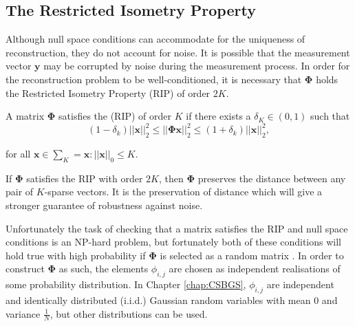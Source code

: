 \subsection{The Restricted Isometry Property}
\label{sec:restr-isom-prop}
Although null space conditions can accommodate for the uniqueness of reconstruction, they do not account for noise. It is possible that the measurement vector $\boldsymbol{y}$ may be corrupted by noise during the measurement process. In order for the reconstruction problem to be well-conditioned, it is necessary that ${\boldsymbol{\Phi}}$ holds the Restricted Isometry Property (RIP) \cite{Donoho2006} of order $2K$. 
\begin{mydef}
 A matrix $\boldsymbol{\Phi}$ satisfies the (RIP) of order $K$ if there exists a $\delta_K  \in (0,1)$ such that 
\begin{equation*}
  \label{eq:40}
  (1 - \delta_k)||\boldsymbol{x}||^2_2 \leq||\boldsymbol{\Phi} \boldsymbol{x}||^2_2 \leq (1 + \delta_k)||\boldsymbol{x}||^2_2,
\end{equation*}

for all $\boldsymbol{x} \in \sum_K = {\boldsymbol{x}:||\boldsymbol{x}||_0 \leq K} $. 
\end{mydef}

%

If $\boldsymbol{\Phi}$ satisfies the RIP with order $2K$, then $\boldsymbol{\Phi}$ preserves the distance between any pair of $K$-sparse vectors. It is the preservation of distance which will give a stronger guarantee of robustness against noise. 


Unfortunately the task of checking that a matrix satisfies the RIP and null space conditions is an NP-hard problem, but fortunately both of these conditions will hold true with high probability if $\boldsymbol{\Phi}$ is selected as a random matrix \citep{Baraniuk2007}. In order to construct $\boldsymbol{\Phi}$ as such, the elements  $\phi_{i,j}$  are chosen as independent realisations of some probability distribution. In Chapter \ref{chap:CSBGS}, $\phi_{i,j}$ are independent and identically distributed (i.i.d.) Gaussian random variables with mean 0 and variance  $\frac{1}{N}$, but other distributions can be used.

